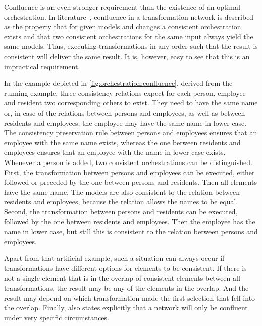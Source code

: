 Confluence is an even stronger requirement than the existence of an optimal orchestration.
In literature~\cite{stevens2020BidirectionalTransformationLarge-SoSym}, confluence in a transformation network is described as the property that for given models and changes a consistent orchestration exists and that two consistent orchestrations for the same input always yield the same models.
Thus, executing transformations in any order such that the result is consistent will deliver the same result.
It is, however, easy to see that this is an impractical requirement.

In the example depicted in \autoref{fig:orchestration:confluence}, derived from the running example, three consistency relations expect for each person, employee and resident two corresponding others to exist.
They need to have the same name or, in case of the relations between persons and employees, as well as between residents and employees, the employee may have the same name in lower case.
The consistency preservation rule between persons and employees ensures that an employee with the same name exists, whereas the one between residents and employees ensures that an employee with the name in lower case exists.
Whenever a person is added, two consistent orchestrations can be distinguished.
First, the transformation between persons and employees can be executed, either followed or preceded by the one between persons and residents. Then all elements have the same name.
The models are also consistent to the relation between residents and employees, because the relation allows the names to be equal.
Second, the transformation between persons and residents can be executed, followed by the one between residents and employees.
Then the employee has the name in lower case, but still this is consistent to the relation between persons and employees.

Apart from that artificial example, such a situation can always occur if transformations have different options for elements to be consistent.
If there is not a single element that is in the overlap of consistent elements between all transformations, the result may be any of the elements in the overlap.
And the result may depend on which transformation made the first selection that fell into the overlap.
Finally, \textcite[p. 14]{stevens2020BidirectionalTransformationLarge-SoSym} also states explicitly that a network will only be confluent under very specific circumstances.

